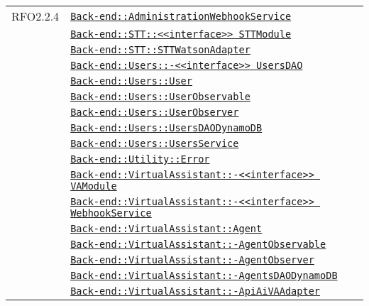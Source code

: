 \begin{longtable}{|>{\centering}m{3cm}|m{10cm}<{\centering}|}
RFO2.2.4 & \hyperref[Back-end::AdministrationWebhookService]{\texttt{Back-end::AdministrationWebhookService}}\\
& \hyperref[Back-end::STT::<<interface>> STTModule]{\texttt{Back-end::STT::<<interface>> STTModule}}\\
& \hyperref[Back-end::STT::STTWatsonAdapter]{\texttt{Back-end::STT::STTWatsonAdapter}}\\
& \hyperref[Back-end::Users::<<interface>> UsersDAO]{\texttt{Back-end::Users::-\linebreak <<interface>> UsersDAO}}\\
& \hyperref[Back-end::Users::User]{\texttt{Back-end::Users::User}}\\
& \hyperref[Back-end::Users::UserObservable]{\texttt{Back-end::Users::UserObservable}}\\
& \hyperref[Back-end::Users::UserObserver]{\texttt{Back-end::Users::UserObserver}}\\
& \hyperref[Back-end::Users::UsersDAODynamoDB]{\texttt{Back-end::Users::UsersDAODynamoDB}}\\
& \hyperref[Back-end::Users::UsersService]{\texttt{Back-end::Users::UsersService}}\\
& \hyperref[Back-end::Utility::Error]{\texttt{Back-end::Utility::Error}}\\
& \hyperref[Back-end::VirtualAssistant::<<interface>> VAModule]{\texttt{Back-end::VirtualAssistant::-\linebreak <<interface>> VAModule}}\\
& \hyperref[Back-end::VirtualAssistant::<<interface>> WebhookService]{\texttt{Back-end::VirtualAssistant::-\linebreak <<interface>> WebhookService}}\\
& \hyperref[Back-end::VirtualAssistant::Agent]{\texttt{Back-end::VirtualAssistant::Agent}}\\
& \hyperref[Back-end::VirtualAssistant::AgentObservable]{\texttt{Back-end::VirtualAssistant::-\linebreak AgentObservable}}\\
& \hyperref[Back-end::VirtualAssistant::AgentObserver]{\texttt{Back-end::VirtualAssistant::-\linebreak AgentObserver}}\\
& \hyperref[Back-end::VirtualAssistant::AgentsDAODynamoDB]{\texttt{Back-end::VirtualAssistant::-\linebreak AgentsDAODynamoDB}}\\
& \hyperref[Back-end::VirtualAssistant::ApiAiVAAdapter]{\texttt{Back-end::VirtualAssistant::-\linebreak ApiAiVAAdapter}}\\

\end{longtable}
